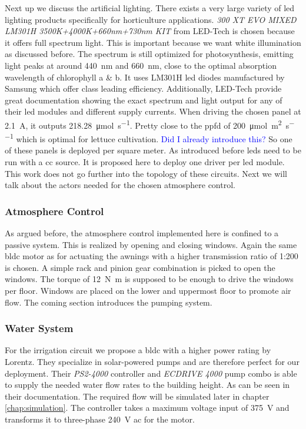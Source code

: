 Next up we discuss the artificial lighting.
There exists a very large variety of \ac{led} lighting products specifically for horticulture applications.
\textit{300 XT EVO MIXED LM301H 3500K+4000K+660nm+730nm KIT} from LED-Tech is chosen because it offers full spectrum light.
This is important because we want white illumination as discussed before.
The spectrum is still optimized for photosynthesis, emitting light peaks at around \SI{440}{\nm} and \SI{660}{\nm}, close to the optimal absorption wavelength of chlorophyll a \& b.
It uses LM301H \ac{led} diodes manufactured by Samsung which offer class leading efficiency.
Additionally, LED-Tech provide great documentation showing the exact spectrum and light output for any of their \ac{led} modules and different supply currents.
When driving the chosen panel at \SI{2.1}{\A}, it outputs \SI{218.28}{\umol\per\s}.
Pretty close to the \ac{ppfd} of \SI{200}{\umol\per\square\m\per\s} which is optimal for lettuce cultivation.
\textcolor{Blue}{Did I already introduce this?}
So one of these panels is deployed per square meter.
As introduced before \acp{led} need to be run with a \ac{cc} source.
It is proposed here to deploy one driver per \ac{led} module.
This work does not go further into the topology of these circuits.
Next we will talk about the actors needed for the chosen atmosphere control.

\subsubsection{Atmosphere Control}
As argued before, the atmosphere control implemented here is confined to a passive system.
This is realized by opening and closing windows.
Again the same \ac{bldc} motor as for actuating the awnings with a higher transmission ratio of 1:200 is chosen.
A simple rack and pinion gear combination is picked to open the windows.
The torque of \SI{12}{\N\m} is supposed to be enough to drive the windows per floor.
Windows are placed on the lower and uppermost floor to promote air flow.
The coming section introduces the pumping system.

\subsubsection{Water System}
For the irrigation circuit we propose a \ac{bldc} with a higher power rating by Lorentz.
They specialize in solar-powered pumps and are therefore perfect for our deployment.
Their \textit{PS2-4000} controller and \textit{ECDRIVE 4000} pump combo is able to supply the needed water flow rates to the building height.
As can be seen in their documentation.
The required flow will be simulated later in chapter \ref{chap:simulation}.
The controller takes a maximum voltage input of \SI{375}{\V} and transforms it to three-phase \SI{240}{\V} \ac{ac} for the motor.

